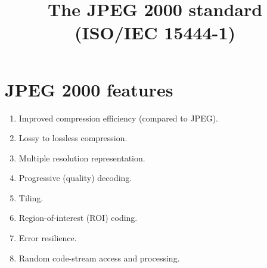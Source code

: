 \title{The JPEG 2000 standard (ISO/IEC 15444-1)}

\maketitle
\tableofcontents

\section{JPEG 2000 features}

\begin{enumerate}
\item Improved compression efficiency (compared to JPEG).
\item Lossy to lossless compression.
\item Multiple resolution representation.
\item Progressive (quality) decoding.
\item Tiling.
\item Region-of-interest (ROI) coding.
\item Error resilience.
\item Random code-stream access and processing.
\end{enumerate}

